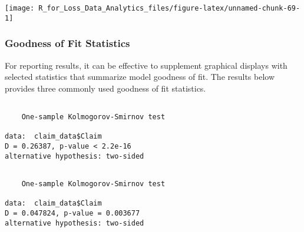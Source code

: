 \documentclass[]{book}
\newenvironment{Shaded}{\begin{snugshade}}{\end{snugshade}}
\newcommand{\KeywordTok}[1]{\textcolor[rgb]{0.13,0.29,0.53}{\textbf{#1}}}
\newcommand{\DataTypeTok}[1]{\textcolor[rgb]{0.13,0.29,0.53}{#1}}
\newcommand{\DecValTok}[1]{\textcolor[rgb]{0.00,0.00,0.81}{#1}}
\newcommand{\StringTok}[1]{\textcolor[rgb]{0.31,0.60,0.02}{#1}}
\newcommand{\CommentTok}[1]{\textcolor[rgb]{0.56,0.35,0.01}{\textit{#1}}}
\newcommand{\OperatorTok}[1]{\textcolor[rgb]{0.81,0.36,0.00}{\textbf{#1}}}
\newcommand{\NormalTok}[1]{#1}
\theoremstyle{definition}
\theoremstyle{definition}
\theoremstyle{definition}
\theoremstyle{remark}
\begin{document}
\begin{center}\texttt{[image: R\_for\_Loss\_Data\_Analytics\_files/figure-latex/unnamed-chunk-69-1]} \end{center}

\subsubsection{Goodness of Fit
Statistics}\label{goodness-of-fit-statistics}

For reporting results, it can be effective to supplement graphical
displays with selected statistics that summarize model goodness of fit.
The results below provides three commonly used goodness of fit
statistics.

\begin{Shaded}
\end{Shaded}

\begin{verbatim}

    One-sample Kolmogorov-Smirnov test

data:  claim_data$Claim
D = 0.26387, p-value < 2.2e-16
alternative hypothesis: two-sided
\end{verbatim}

\begin{Shaded}
\end{Shaded}

\begin{verbatim}

    One-sample Kolmogorov-Smirnov test

data:  claim_data$Claim
D = 0.047824, p-value = 0.003677
alternative hypothesis: two-sided
\end{verbatim}
\end{document}
